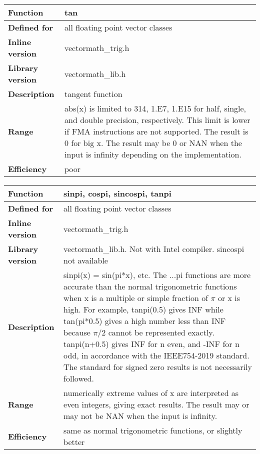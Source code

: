 \documentclass[vcl_manual.tex]{subfiles}
\begin{document}
\begin{tabular}{|p{30mm}|p{120mm}|}
\hline
\bfseries Function & tan \\ \hline
\bfseries Defined for & all floating point vector classes \\ \hline
\bfseries Inline version & vectormath\_trig.h \\ \hline
\bfseries Library version & vectormath\_lib.h \\ \hline
\bfseries Description & tangent function \\ \hline
\bfseries Range & abs(x) is limited to 314, 1.E7, 1.E15 for half, single, and double precision, respectively. This limit is lower if FMA instructions are not supported. The result is 0 for big x. The result may be 0 or NAN when the input is infinity depending on the implementation. \\ \hline
\bfseries Efficiency & poor \\ \hline
\end{tabular}

\begin{tabular}{|p{30mm}|p{120mm}|}
\hline
\bfseries Function & sinpi, cospi, sincospi, tanpi \\ \hline
\bfseries Defined for & all floating point vector classes \\ \hline
\bfseries Inline version & vectormath\_trig.h \\ \hline
\bfseries Library version & vectormath\_lib.h. Not with Intel compiler. sincospi not available \\ \hline
\bfseries Description & sinpi(x) = sin(pi*x), etc. \newline
The ...pi functions are more accurate than the normal trigonometric functions when x is a multiple or simple fraction of $\pi$ or x is high. For example, tanpi(0.5) gives INF while tan(pi*0.5) gives a high number less than INF because $\pi/2$ cannot be represented exactly. tanpi(n+0.5) gives INF for n even, and -INF for n odd, in accordance with the IEEE754-2019 standard. The standard for signed zero results is not necessarily followed. \\ \hline
\bfseries Range & numerically extreme values of x are interpreted as even integers, giving exact results. The result may or may not be NAN when the input is infinity. \\ \hline
\bfseries Efficiency & same as normal trigonometric functions, or slightly better \\ \hline
\end{tabular}
\end{document}
